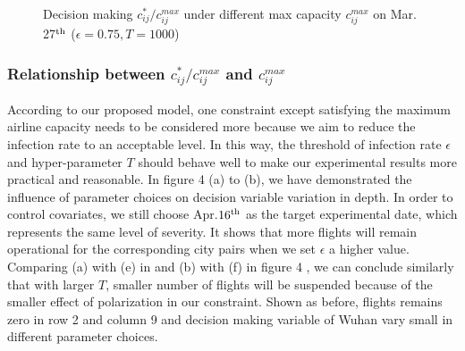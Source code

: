 \documentclass[11pt,twocolumn]{article}
\begin{document}
\begin{figure}[H]
    \centering
    \caption{Decision making $c_{ij}^* / c_{ij}^{max}$ under different max capacity $c_{ij}^{max}$ on Mar. 27$^{\rm th}$ ($\epsilon=0.75,T=1000$)}
    \label{fig:my_label}
\end{figure}



\subsubsection{Relationship between $c_{ij}^* / c_{ij}^{max}$ and $c_{ij}^{max}$}
According to our proposed model, one constraint except satisfying the maximum airline capacity needs to be considered more because we aim to reduce the infection rate to an acceptable level. In this way, the threshold of infection rate $\epsilon$ and hyper-parameter $T$ should behave well to make our experimental results more practical and reasonable. In figure 4 (a) to (b), we have demonstrated the influence of parameter choices on decision variable variation in depth. In order to control covariates, we still choose Apr.$16^{\rm th}$ as the target experimental date, which represents the same level of severity. It shows that more flights will remain operational for the corresponding city pairs when we set $\epsilon$ a higher value. Comparing (a) with (e) in and (b) with (f) in figure 4 , we can conclude similarly that with larger $T$, smaller number of flights will be suspended because of the smaller effect of polarization in our constraint. Shown as before, flights remains zero in row 2 and column 9 and decision making variable of Wuhan vary small in different parameter choices.
\end{document}

